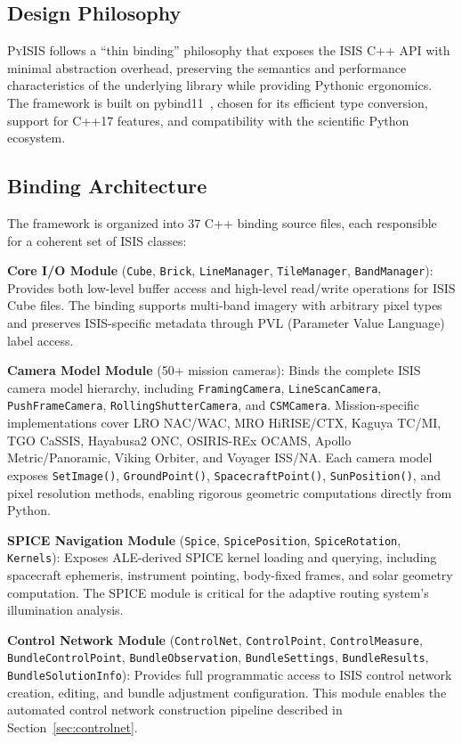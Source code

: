 \documentclass[lettersize,journal]{IEEEtran}
\newcommand{\pyisis}{\textsc{PyISIS}}
\begin{document}
\subsection{Design Philosophy}

\pyisis{} follows a ``thin binding'' philosophy that exposes the ISIS C++ API with minimal abstraction overhead, preserving the semantics and performance characteristics of the underlying library while providing Pythonic ergonomics. The framework is built on pybind11~\cite{jakob2017pybind11}, chosen for its efficient type conversion, support for C++17 features, and compatibility with the scientific Python ecosystem.

\subsection{Binding Architecture}

The framework is organized into 37 C++ binding source files, each responsible for a coherent set of ISIS classes:

\textbf{Core I/O Module} (\texttt{Cube}, \texttt{Brick}, \texttt{LineManager}, \texttt{TileManager}, \texttt{BandManager}): Provides both low-level buffer access and high-level read/write operations for ISIS Cube files. The binding supports multi-band imagery with arbitrary pixel types and preserves ISIS-specific metadata through PVL (Parameter Value Language) label access.

\textbf{Camera Model Module} (50+ mission cameras): Binds the complete ISIS camera model hierarchy, including \texttt{FramingCamera}, \texttt{LineScanCamera}, \texttt{PushFrameCamera}, \texttt{RollingShutterCamera}, and \texttt{CSMCamera}. Mission-specific implementations cover LRO NAC/WAC, MRO HiRISE/CTX, Kaguya TC/MI, TGO CaSSIS, Hayabusa2 ONC, OSIRIS-REx OCAMS, Apollo Metric/Panoramic, Viking Orbiter, and Voyager ISS/NA. Each camera model exposes \texttt{SetImage()}, \texttt{GroundPoint()}, \texttt{SpacecraftPoint()}, \texttt{SunPosition()}, and pixel resolution methods, enabling rigorous geometric computations directly from Python.

\textbf{SPICE Navigation Module} (\texttt{Spice}, \texttt{SpicePosition}, \texttt{SpiceRotation}, \texttt{Kernels}): Exposes ALE-derived SPICE kernel loading and querying, including spacecraft ephemeris, instrument pointing, body-fixed frames, and solar geometry computation. The SPICE module is critical for the adaptive routing system's illumination analysis.

\textbf{Control Network Module} (\texttt{ControlNet}, \texttt{ControlPoint}, \texttt{ControlMeasure}, \texttt{BundleControlPoint}, \texttt{BundleObservation}, \texttt{BundleSettings}, \texttt{BundleResults}, \texttt{BundleSolutionInfo}): Provides full programmatic access to ISIS control network creation, editing, and bundle adjustment configuration. This module enables the automated control network construction pipeline described in Section~\ref{sec:controlnet}.
\end{document}
